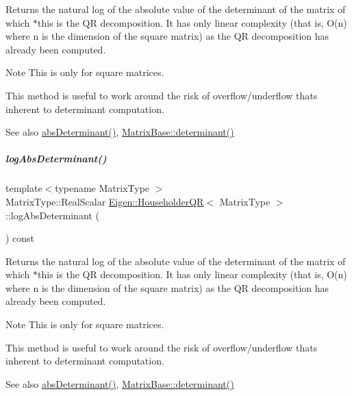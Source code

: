 \begin{DoxyReturn}{Returns}
the natural log of the absolute value of the determinant of the matrix of which $\ast$this is the QR decomposition. It has only linear complexity (that is, O(n) where n is the dimension of the square matrix) as the QR decomposition has already been computed.
\end{DoxyReturn}
\begin{DoxyNote}{Note}
This is only for square matrices.

This method is useful to work around the risk of overflow/underflow that\textquotesingle{}s inherent to determinant computation.
\end{DoxyNote}
\begin{DoxySeeAlso}{See also}
\hyperlink{group___q_r___module_aaf4ef26c0b7affc91431ec59c92d64c3}{abs\+Determinant()}, \hyperlink{group___core___module_a7ad8f77004bb956b603bb43fd2e3c061}{Matrix\+Base\+::determinant()} 
\end{DoxySeeAlso}
\mbox{\label{group___q_r___module_af61b6dbef34fc51c825182b16dc43ca1}} 
\subparagraph{\texorpdfstring{log\+Abs\+Determinant()}{logAbsDeterminant()}\hspace{0.1cm}{\footnotesize\ttfamily [2/2]}}
{\footnotesize\ttfamily template$<$typename Matrix\+Type $>$ \\
Matrix\+Type\+::\+Real\+Scalar \hyperlink{group___q_r___module_class_eigen_1_1_householder_q_r}{Eigen\+::\+Householder\+QR}$<$ Matrix\+Type $>$\+::log\+Abs\+Determinant (\begin{DoxyParamCaption}{ }\end{DoxyParamCaption}) const}

\begin{DoxyReturn}{Returns}
the natural log of the absolute value of the determinant of the matrix of which $\ast$this is the QR decomposition. It has only linear complexity (that is, O(n) where n is the dimension of the square matrix) as the QR decomposition has already been computed.
\end{DoxyReturn}
\begin{DoxyNote}{Note}
This is only for square matrices.

This method is useful to work around the risk of overflow/underflow that\textquotesingle{}s inherent to determinant computation.
\end{DoxyNote}
\begin{DoxySeeAlso}{See also}
\hyperlink{group___q_r___module_aaf4ef26c0b7affc91431ec59c92d64c3}{abs\+Determinant()}, \hyperlink{group___core___module_a7ad8f77004bb956b603bb43fd2e3c061}{Matrix\+Base\+::determinant()} 
\end{DoxySeeAlso}


